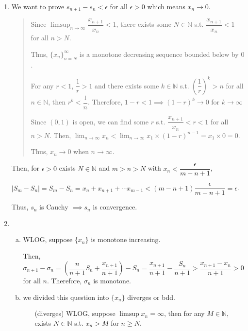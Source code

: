 \documentclass[12pt]{article}
\begin{document}
\begin{enumerate}
    \item We want to prove $s_{n+1} - s_n < \epsilon$ for all $\epsilon > 0$ which means $x_n \to 0$.
    \begin{quote}
        Since $\displaystyle\limsup_{n \to \infty} \dfrac{x_{n+1}}{x_n} < 1$, 
        there exists some $N\in \mathbb{N}$ s.t. $\dfrac{x_{n+1}}{x_n} < 1$ for all $n > N$.

        Thus, $\lbrace x_n\rbrace_{n = N}^\infty$ is a monotone decreasing sequence bounded below by $0$.

        For any $r < 1$, $\dfrac{1}{r} > 1$ and there exists some $k \in \mathbb{N}$ s.t. $(\dfrac{1}{r})^k > n$ for all $n\in \mathbb{N}$,
        then $r^k < \dfrac{1}{n}$. Therefore, $1-r < 1\implies (1-r)^k \to 0$ for $k \to \infty$
        
        Since $(0, 1)$ is open, we can find some $r$ s.t.  $\dfrac{x_{n+1}}{x_n} < r < 1$ for all $n > N$. 
        Then, $\displaystyle\lim_{n\to \infty} x_n < \displaystyle\lim_{n\to\infty} x_1\times(1 - r)^{n-1} = x_1 \times 0 = 0$.

        Thus, $x_n \to 0$ when $n \to \infty$.
    \end{quote}

    \newpage
    Then, for $\epsilon > 0$  exists $N \in \mathbb{N}$ and $m > n > N$ with $x_n < \dfrac{\epsilon}{m-n+1}$, 
    
    $|S_m - S_n| = S_m - S_n = x_n + x_{n+1} + \cdots x_{m-1} < (m-n+1)\dfrac{\epsilon}{m-n+1} = \epsilon$.
    
    Thus, $s_n$ is Cauchy $\implies s_n$ is convergence.
    
    \item \begin{enumerate}[(a)]
        \item WLOG, suppose $\lbrace x_n \rbrace$ is monotone increasing.
        
        Then, $\sigma_{n+1} - \sigma_n = (\dfrac{n}{n+1} S_n + \dfrac{x_{n+1}}{n+1}) - S_n = \dfrac{x_{n+1}}{n+1} - \dfrac{S_n}{n+1} > \dfrac{x_{n+1}-x_n}{n+1} > 0$ for all $n$.
        Therefore, $\sigma_n$ is monotone.

        \item we divided this question into $\lbrace x_n\rbrace$ diverges or bdd.
        
        \begin{enumerate}
            \item[(diverges)] WLOG, suppose $\limsup x_n = \infty$, then for any $M\in \mathbb{N}$, exists $N \in \mathbb{N}$ s.t. $x_n > M$ for $n \geq N$.
            

\end{enumerate}
\end{enumerate}
\end{enumerate}
\end{document}
